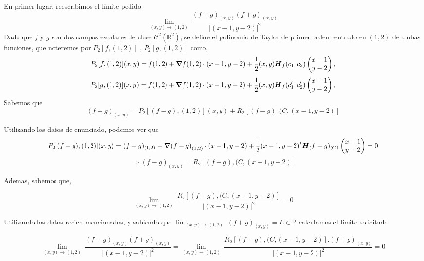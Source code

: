 \begin{solution}
   En primer lugar, reescribimos el límite pedido 
   \[
        \lim_{(x,y)\to(1,2)} \
        \frac{(f-g)_{(x,y)}(f+g)_{(x,y) }}{|(x-1,y-2)|^2}
    \]
    Dado que $f$  y $g$ son dos campos escalares de clase  $\mathcal{C}^2(\mathbb{R}^2)$,  se define  el polinomio de Taylor de primer orden centrado en $(1,2)$ de ambas funciones, que noteremos por $P_2[f,(1,2)]$ , $P_2[g,(1,2)]$ como,
    \begin{equation}
        P_2[f,(1,2)](x,y)=f(1,2)+\grad f(1,2)\cdot(x-1,y-2)+ \frac{1}{2}(x,y)\boldsymbol{H}_f(c_1,c_2)\begin{pmatrix}x-1\\y-2\end{pmatrix}, \label{eq:polTay2.1}
    \end{equation}
    \begin{equation}
        P_2[g,(1,2)](x,y)=f(1,2)+\grad f(1,2)\cdot(x-1,y-2)+ \frac{1}{2}(x,y)\boldsymbol{H}_f(c_1',c_2')\begin{pmatrix}x-1\\y-2\end{pmatrix}, \label{eq:polTay2.2}
    \end{equation}
Sabemos que
\[
        (f-g)_{(x,y)}=  P_2[(f-g),(1,2)](x,y) + R_2[(f-g),(C,(x-1,y-2)] 
    \]
  

Utilizando los datos de enunciado, podemos ver que
\[
       P_2[(f-g),(1,2)](x,y)= (f-g)_{(1,2)}+\grad (f-g)_{(1,2)}\cdot(x-1,y-2)+ \frac{1}{2}(x-1, y-2)^t\boldsymbol{H}_(f-g)_{(C)}\begin{pmatrix}x-1\\y-2\end{pmatrix} =0
    \]
    \[
      \Rightarrow 
        (f-g)_{(x,y)}=  R_2[(f-g),(C,(x-1,y-2)] 
    \]

    Ademas, sabemos que,
  
    \[
        \lim_{(x,y)\to(1,2)} \
        \frac{R_2[(f-g),(C,(x-1,y-2)]}{|(x-1,y-2)|^2}=0
    \]

Utilizando los datos recien mencionados, y sabiendo que $ \lim_{(x,y)\to(1,2)} \
        (f+g)_{(x,y) }=L \in \mathbb{R} $ calculamos el limite solicitado

  \[
        \lim_{(x,y)\to(1,2)} \
        \frac{(f-g)_{(x,y)}(f+g)_{(x,y) }}{|(x-1,y-2)|^2}=\lim_{(x,y)\to(1,2)} \
        \frac{R_2[(f-g),(C,(x-1,y-2)]. (f+g)_{(x,y) }}{|(x-1,y-2)|^2}=0
    \]
    
    
 
\end{solution}

